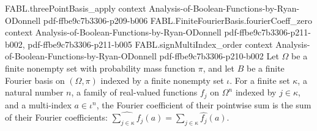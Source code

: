 \begin{theorem}
\proofstep
  {FABL.threePointBasis_apply}
  {context}
  {Analysis-of-Boolean-Functions-by-Ryan-ODonnell}
  {pdf-ffbe9c7b3306-p209-b006}
\proofstep
  {FABL.FiniteFourierBasis.fourierCoeff_zero}
  {context}
  {Analysis-of-Boolean-Functions-by-Ryan-ODonnell}
  {pdf-ffbe9c7b3306-p211-b002,
    pdf-ffbe9c7b3306-p211-b005}
\proofstep
  {FABL.signMultiIndex_order}
  {context}
  {Analysis-of-Boolean-Functions-by-Ryan-ODonnell}
  {pdf-ffbe9c7b3306-p210-b002}
Let $\Omega$ be a finite nonempty set with probability mass function $\pi$, and let $B$
be a finite Fourier basis on $(\Omega,\pi)$ indexed by a finite nonempty set $\iota$.
For a finite set $\kappa$, a natural number $n$, a family of real-valued functions $f_j$
on $\Omega^n$ indexed by $j\in\kappa$, and a multi-index $a\in\iota^n$, the Fourier
coefficient of their pointwise sum is the sum of their Fourier coefficients:
$\widehat{\sum_{j\in\kappa} f_j}(a)=\sum_{j\in\kappa}\widehat{f_j}(a)$.
\end{theorem}

